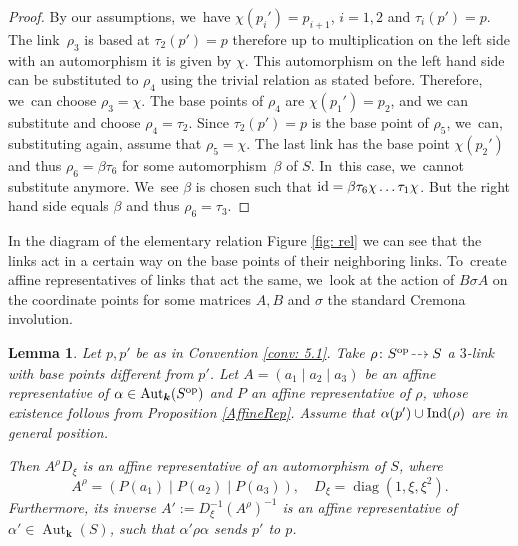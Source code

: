 \documentclass[JEP,XML,SOM,Unicode,NoFloatCountersInSection, NoEqCountersInSection,published]{cedram}
\newcommand{\dradpl}{{\hspace*{-2mm}\begin{tikzcd}[ampersand replacement=\&,column sep = scriptsize]\mbox{}\ar[r,dashed]\&\mbox{}\end{tikzcd}\hspace*{-2mm}}}
\newcommand{\dratst}{{\hspace*{-2.5mm}\begin{tikzcd}[ampersand replacement=\&,column sep = small]\mbox{}\ar[r,dashed]\&\mbox{}\end{tikzcd}\hspace*{-2mm}}}
\let\drascst\dratst
\newcommand{\dra}{\mathchoice{\dradpl}{\dratst}{\drascst}{\drascst}}
\newcommand{\id}{\textup{id}}
\newcommand{\Ind}{\textup{Ind}}
\newcommand{\op}{\textup{op}}
\DeclareMathOperator{\diag}{diag}
\newtheorem{lemma}[theorem]{Lemma}
\theoremstyle{definition}
\newcommand{\kk}{{\boldsymbol{k}}}
\DeclareMathOperator{\Aut}{Aut}
\begin{document}
\begin{proof}
By our assumptions, we~have $\chi(p_i') = p_{i + 1}$, $i = 1,2$ and $\tau_i(p') = p$. The link~$\rho_3$ is based at $\tau_2(p') = p$ therefore up to multiplication on the left side with an automorphism it is given by $\chi$. This automorphism on the left hand side can be substituted to $\rho_4$ using the trivial relation as stated before. Therefore, we~can choose $\rho_3 = \chi$. The base points of $\rho_4$ are $\chi(p_1') = p_2$, and we can substitute and choose $\rho_4 = \tau_2$. Since $\tau_2(p') = p$ is the base point of $\rho_5$, we~can, substituting again, assume that $\rho_5 = \chi$. The last link has the base point $\chi(p_2')$ and thus $\rho_6 = \beta \tau_6$ for some automorphism~$\beta$ of $S$. In~this case, we~cannot substitute anymore. We~see $\beta$ is chosen such that $\id = \beta \tau_6 \chi \dots \tau_1 \chi$. But the right hand side equals $\beta$ and thus $\rho_6 = \tau_3$.
\end{proof}
In the diagram of the elementary relation Figure \ref{fig: rel} we can see that the links act in a certain way on the base points of their neighboring links. To~create affine representatives of links that act the same, we~look at the action of $B \sigma A$ on the coordinate points for some matrices $A,B$ and $\sigma$ the standard Cremona involution.

\begin{lemma} \label{FixMatr}
Let $p,p'$ be as in Convention \ref{conv: 5.1}. Take $\rho \colon S^{\op} \dra S$ a $3$\nobreakdash-link with base points different from $p'$. Let $A = (a_1 \mid a_2 \mid a_3)$ be an affine representative of $\alpha \in \Aut_{\kk}(S^{\op})$ and $P$ an affine representative of $\rho$, whose existence follows from Proposition \ref{AffineRep}. Assume that $\alpha(p') \cup \Ind(\rho)$ are in general position.

Then $A^{\rho}D_{\xi}$ is an affine representative of an automorphism of $S$, where
\[
A^{\rho} = (P(a_1) \mid P(a_2) \mid P(a_3)), \quad D_{\xi} = \diag(1, \xi, \xi^2).
\]
Furthermore, its inverse $A' := D_{\xi}^{-1} (A^{\rho})^{-1}$ is an affine representative of $\alpha' \in \Aut_{\kk}(S)$, such that $\alpha' \rho \alpha$ sends $p'$ to $p$.
\end{lemma}
\end{document}
